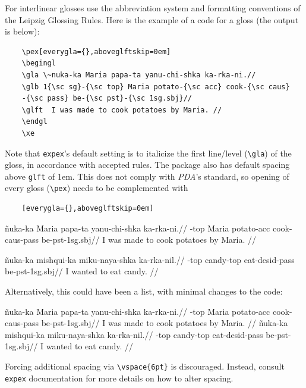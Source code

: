 \documentclass{article}
\begin{document}
For interlinear glosses use the abbreviation system and formatting conventions of the Leipzig Glossing Rules. Here is the example of a code for a gloss (the output is below):

\begin{verbatim}
    \pex[everygla={},aboveglftskip=0em]
    \begingl
    \gla \~nuka-ka Maria papa-ta yanu-chi-shka ka-rka-ni.//
    \glb 1{\sc sg}-{\sc top} Maria potato-{\sc acc} cook-{\sc caus}
    -{\sc pass} be-{\sc pst}-{\sc 1sg.sbj}//
    \glft  I was made to cook potatoes by Maria. //
    \endgl
    \xe
\end{verbatim}

Note that \verb=expex='s default setting is to italicize the first line/level (\verb=\gla=) of the gloss, in accordance with accepted rules. The package also has default spacing above \verb=glft= of 1em. This does not comply with \textit{PDA}'s standard, so opening of every gloss (\verb=\pex=) needs to be complemented with 

\begin{verbatim}
    [everygla={},aboveglftskip=0em]
\end{verbatim}

\pex[everygla={},aboveglftskip=0em]
\begingl
\gla \~nuka-ka Maria papa-ta yanu-chi-shka ka-rka-ni.//
-{\sc top} Maria potato-{\sc acc} cook-{\sc caus}-{\sc pass} be-{\sc pst}-{\sc 1sg.sbj}//
\glft  I was made to cook potatoes by Maria. //
\endgl
\xe

\pex[everygla={},aboveglftskip=0em] \begingl
\gla *\~nuka-ka mishqui-ka miku-naya-shka ka-rka-nil.//
-{\sc top} candy-{\sc top} eat-{\sc desid}-{\sc pass} be-{\sc pst}-1{\sc sg.sbj}//
\glft  I wanted to eat candy. //
\endgl
\xe

Alternatively, this could have been a list, with minimal changes to the code:

\pex[everygla={},aboveglftskip=0em]
\a \begingl
\gla \~nuka-ka Maria papa-ta yanu-chi-shka ka-rka-ni.//
-{\sc top} Maria potato-{\sc acc} cook-{\sc caus}-{\sc pass} be-{\sc pst}-{\sc 1sg.sbj}//
\glft  I was made to cook potatoes by Maria. //
\endgl
\a \begingl
\gla *\~nuka-ka mishqui-ka miku-naya-shka ka-rka-nil.//
-{\sc top} candy-{\sc top} eat-{\sc desid}-{\sc pass} be-{\sc pst}-1{\sc sg.sbj}//
\glft  I wanted to eat candy. //
\endgl
\xe

Forcing additional spacing via \verb=\vspace{6pt}= is discouraged. Instead, consult \verb=expex= documentation for more details on how to alter spacing.
\end{document}
